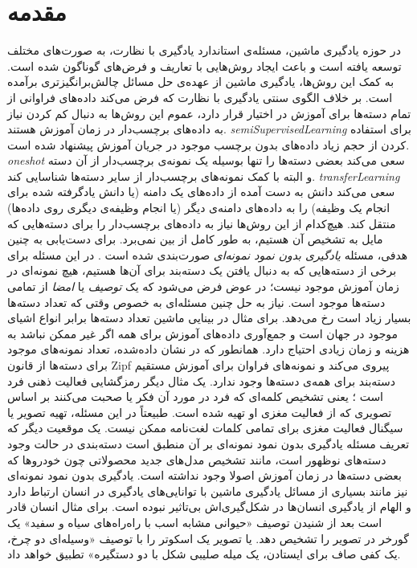 \chapter{مقدمه } \label{intro}

 در حوزه یادگیری ماشین، مسئله‌ی استاندارد یادگیری با نظارت، به صورت‌های مختلف توسعه یافته است و باعث ایجاد روش‌هایی با تعاریف و فرض‌های گوناگون شده است. به کمک این روش‌ها، یادگیری ماشین از عهده‌ی حل مسائل چالش‌برانگیزتری برآمده است. بر خلاف الگوی سنتی یادگیری با نظارت که فرض می‌کند داده‌های فراوانی از تمام دسته‌ها برای آموزش در اختیار قرار دارد، عموم این روش‌ها به دنبال کم کردن نیاز به داده‌های برچسب‌دار در زمان آموزش هستند.
\emph{\gls{semiSupervisedLearning}}\cite{chapel06}
برای استفاده کردن از حجم زیاد داده‌های بدون برچسب موجود در جریان آموزش پیشنهاد شده است.
\emph{\gls{oneshot}} \cite{miller12}
سعی می‌کند بعضی دسته‌ها را تنها بوسیله یک نمونه‌ی برچسب‌دار از آن دسته و البته با کمک نمونه‌های برچسب‌دار از سایر دسته‌ها شناسایی کند.
\emph{\gls{transferLearning}} \cite{pan10survey}
سعی می‌کند دانش به دست آمده از داده‌های یک دامنه (یا دانش یادگرفته شده برای انجام یک وظیفه) را به داده‌های دامنه‌ی دیگر (یا انجام وظیفه‌ی دیگری روی داده‌ها) منتقل کند.
هیچ‌کدام از این روش‌ها نیاز به داده‌های برچسب‌دار را برای دسته‌هایی که مایل به تشخیص آن هستیم، به طور کامل از بین نمی‌برد. برای دست‌یابی به چنین هدفی،
مسئله \textit{یادگیری بدون نمود نمونه‌ای}  صورت‌بندی شده است \cite{bengio08}. در این مسئله برای برخی از دسته‌هایی که به دنبال یافتن یک دسته‌بند برای آن‌ها هستیم، هیچ نمونه‌ای در زمان آموزش موجود نیست؛ در عوض  فرض می‌شود که یک \emph{ توصیف} یا \emph{امضا}  از تمامی دسته‌ها موجود است. نیاز به حل  چنین مسئله‌ای به خصوص وقتی که تعداد دسته‌ها بسیار زیاد است رخ می‌دهد. برای مثال در بینایی ماشین تعداد دسته‌ها برابر انواع اشیای موجود در جهان است و جمع‌آوری داده‌های آموزش برای همه اگر غیر ممکن نباشد به هزینه و زمان زیادی احتیاج دارد. همانطور که در
\cite{sala11}
نشان داده‌شده، تعداد نمونه‌های موجود برای دسته‌ها از قانون Zipf 
\cite{newman2005power}
پیروی می‌کند و نمونه‌های فراوان برای آموزش مستقیم دسته‌بند برای همه‌ی دسته‌ها وجود ندارد.
 یک مثال دیگر رمزگشایی فعالیت ذهنی فرد است
\cite{hinton09}؛
یعنی تشخیص کلمه‌ای که فرد در مورد آن فکر یا صحبت می‌کنند بر اساس تصویری که از فعالیت مغزی او تهیه شده است. طبیعتاً در این مسئله، تهیه تصویر یا سیگنال فعالیت مغزی برای تمامی کلمات لغت‌نامه ممکن نیست. یک موقعیت دیگر که تعریف مسئله یادگیری بدون نمود نمونه‌ای بر آن منطبق است دسته‌بندی در حالت وجود دسته‌های نوظهور است، مانند تشخیص مدل‌های جدید محصولاتی چون خودروها که بعضی دسته‌ها در زمان آموزش اصولا وجود نداشته است. یادگیری بدون نمود نمونه‌ای نیز مانند بسیاری از مسائل یادگیری ماشین با توانایی‌های یادگیری در انسان ارتباط دارد و الهام از یادگیری انسان‌ها در شکل‌گیری‌اش بی‌تاثیر نبوده است. برای مثال انسان قادر است بعد از شنیدن توصیف «حیوانی مشابه اسب با راه‌راه‌های سیاه و سفید» یک گورخر در تصویر را تشخیص دهد. یا تصویر یک اسکوتر را با توصیف «وسیله‌ای دو چرخ، یک کفی صاف برای ایستادن، یک میله صلیبی شکل با دو دستگیره» تطبیق خواهد داد.

